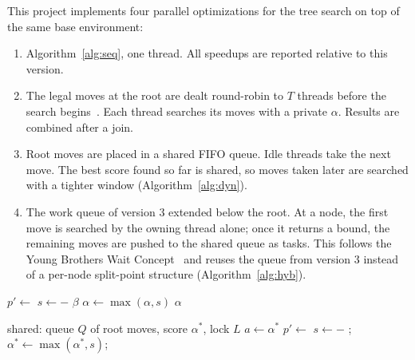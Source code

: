 \documentclass[10pt, conference, compsocconf]{IEEEtran}
\begin{document}
This project implements four parallel optimizations for the tree search on top of the same base environment:

\begin{enumerate}
\item Algorithm~\ref{alg:seq}, one thread. All speedups are reported relative to this version.
\item The legal moves at the root are dealt round-robin to $T$ threads before the search begins~\cite{marsland1982}. Each thread searches its moves with a private $\alpha$. Results are combined after a join.
\item Root moves are placed in a shared FIFO queue. Idle threads take the next move. The best score found so far is shared, so moves taken later are searched with a tighter window (Algorithm~\ref{alg:dyn}).
\item The work queue of version 3 extended below the root. At a node, the first move is searched by the owning thread alone; once it returns a bound, the remaining moves are pushed to the shared queue as tasks. This follows the Young Brothers Wait Concept~\cite{feldmann1989} and reuses the queue from version 3 instead of a per-node split-point structure (Algorithm~\ref{alg:hyb}).
\end{enumerate}

\begin{algorithm}[H]
\caption{Sequential negamax with alpha-beta pruning}
\label{alg:seq}
\begin{algorithmic}[1]
   \Return {} \EndIf
    \State $p' \gets$ 
    \State $s \gets -$
     \Return $\beta$ \EndIf
    \State $\alpha \gets \max(\alpha, s)$
  \EndFor
  \State \Return $\alpha$
\EndFunction
\end{algorithmic}
\end{algorithm}

\begin{algorithm}[H]
\caption{Dynamic root split (worker thread)}
\label{alg:dyn}
\begin{algorithmic}[1]
\State shared: queue $Q$ of root moves, score $\alpha^{*}$, lock $L$
  \State $a \gets \alpha^{*}$
  \State $p' \gets$ 
  \State $s \gets -$
  \State {}; $\alpha^{*} \gets \max(\alpha^{*}, s)$; 
\EndWhile
\end{algorithmic}
\end{algorithm}
\end{document}
